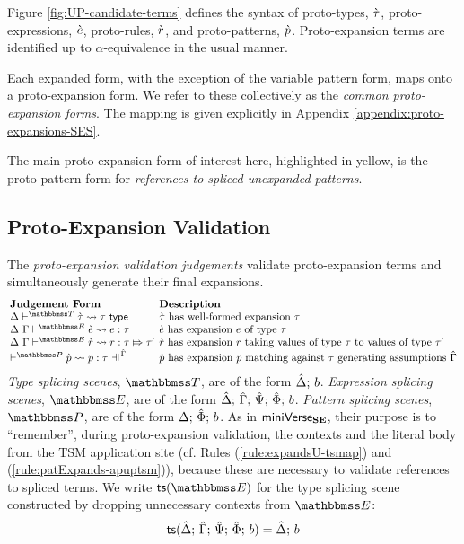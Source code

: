 {{{{Figure \ref{fig:UP-candidate-terms} defines the syntax of proto-types, $\grave{\tau}$, proto-expressions, $\grave{e}$, proto-rules, $\grave{r}$, and proto-patterns, $\grave{p}$. %
Proto-expansion terms are identified up to $\alpha$-equivalence in the usual manner.

Each expanded form, with the exception of the variable pattern form, maps onto a proto-expansion form. We refer to these collectively as the \emph{common proto-expansion forms}. The mapping is given explicitly in Appendix \ref{appendix:proto-expansions-SES}. 

The main proto-expansion form of interest here, highlighted in yellow, is the proto-pattern form for \emph{references to spliced unexpanded patterns}.


\subsection{Proto-Expansion Validation}\label{sec:ce-validation-UP}
The \emph{proto-expansion validation judgements} validate proto-expansion terms and simultaneously generate their final expansions.
\[\arraycolsep=2pt\begin{array}{ll}
\textbf{Judgement Form} & \textbf{Description}\\
\cvalidT{\Delta}{\tscenev}{\ctau}{\tau} & \text{$\ctau$ has well-formed expansion $\tau$}\\
\cvalidE{\Delta}{\Gamma}{\escenev}{\ce}{e}{\tau} & \text{$\ce$ has expansion $e$ of type $\tau$}\\
\cvalidR{\Delta}{\Gamma}{\escenev}{\crv}{r}{\tau}{\tau'} & \text{$\crv$ has expansion $r$ taking values of type $\tau$ to values of type $\tau'$}\\
\cvalidP{\upctx}{\pscenev}{\cpv}{p}{\tau} & \text{$\cpv$ has expansion $p$ matching against $\tau$ generating assumptions $\upctx$}
\end{array}\]
\emph{Type splicing scenes}, $\tscenev$, are of the form $\hat{\Delta};\,b$. \emph{Expression splicing scenes}, $\escenev$, are of the form $\hat{\Delta};\,\hat{\Gamma};\,\hat{\Psi};\,\hat\Phi;\,b$. \emph{Pattern splicing scenes}, $\pscenev$, are of the form $\Delta;\,\hat\Phi;\,b$. As in $\mathsf{miniVerse}_\textbf{SE}$, their purpose is to ``remember'', during proto-expansion validation, the contexts and the literal body from the TSM application site (cf. Rules (\ref{rule:expandsU-tsmap}) and (\ref{rule:patExpands-apuptsm})), because these are necessary to validate references to spliced terms. We write $\tsfrom{\escenev}$ for the type splicing scene constructed by dropping unnecessary contexts from $\escenev$:
\[\mathsf{ts}(\hat{\Delta};\,\hat{\Gamma};\,\hat{\Psi};\,\hat\Phi;\,b) = \hat{\Delta};\,b\]

}}}}
